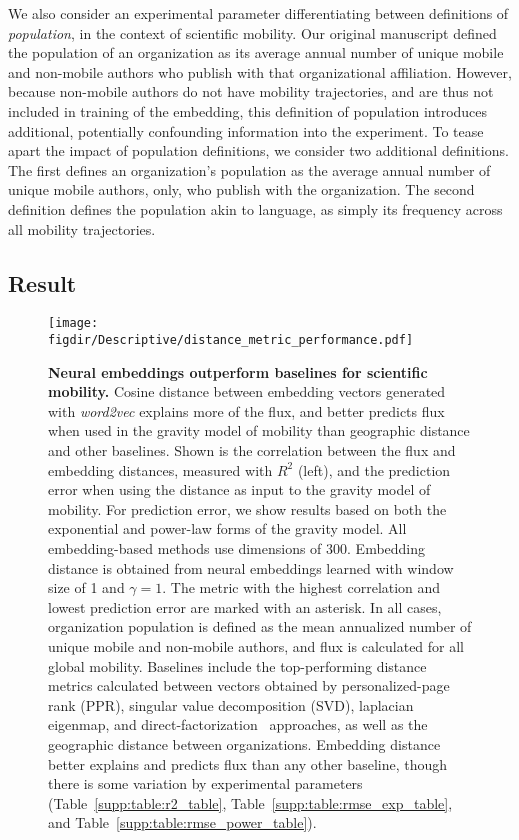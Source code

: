 \documentclass[12pt,a4paper]{article}
\def\figdir{../Figs}
\newcommand{\mycaption}[2]{%
  \caption[#1]{\textbf{#1} \small#2}%
}
\begin{document}
We also consider an experimental parameter differentiating between definitions of \textit{population}, in the context of scientific mobility.
Our original manuscript defined the population of an organization as its average annual number of unique mobile and non-mobile authors who publish with that organizational affiliation.
However, because non-mobile authors do not have mobility trajectories, and are thus not included in training of the embedding, this definition of population introduces additional, potentially confounding information into the experiment.
To tease apart the impact of population definitions, we consider two additional definitions.
The first defines an organization's population as the average annual number of unique mobile authors, only, who publish with the organization.
The second definition defines the population akin to language, as simply its frequency across all mobility trajectories.

\subsection{Result}

%
%
\begin{figure}[ht!]
	\centering
	\texttt{[image: \\figdir/Descriptive/distance\_metric\_performance.pdf]}
	\mycaption
	{Neural embeddings outperform baselines for scientific mobility.}
	{
		Cosine distance between embedding vectors generated with \textit{word2vec} explains more of the flux, and better predicts flux when used in the gravity model of mobility than geographic distance and other baselines.
		Shown is the correlation between the flux and embedding distances, measured with $R^{2}$ (left), and the prediction error when using the distance as input to the gravity model of mobility.
		For prediction error, we show results based on both the exponential and power-law forms of the gravity model.
		All embedding-based methods use dimensions of 300.
		Embedding distance is obtained from neural embeddings learned with window size of 1 and $\gamma = 1$.
		The metric with the highest correlation and lowest prediction error are marked with an asterisk. 
		In all cases, organization population is defined as the mean annualized number of unique mobile and non-mobile authors, and flux is calculated for all global mobility.
		Baselines include the top-performing distance metrics calculated between vectors obtained by personalized-page rank (PPR), singular value decomposition (SVD), laplacian eigenmap, and direct-factorization~\autocite{levy2014neural} approaches, as well as the geographic distance between organizations.
		Embedding distance better explains and predicts flux than any other baseline, though there is some variation by experimental parameters (Table~\ref{supp:table:r2_table}, Table~\ref{supp:table:rmse_exp_table}, and Table~\ref{supp:table:rmse_power_table}).
	}
	\label{fig:supp:distancemetrics}
\end{figure}
\end{document}
